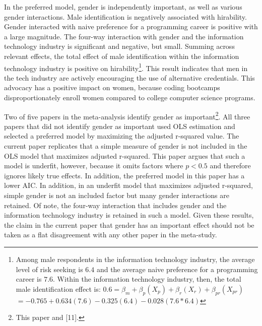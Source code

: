 \documentclass[review]{elsarticle}
\begin{document}
In the preferred model, gender is independently important, as well as various gender interactions.
Male identification is negatively associated with hirability.
Gender interacted with naive preference for a programming career is positive with a large magnitude.
The four-way interaction with gender and the information technology industry is significant and negative, but small.
Summing across relevant effects,
the total effect of male identification within the information technology industry
is positive on hirability\footnote{
    Among male respondents in the information technology industry, the average level of risk seeking is $6.4$
    and the average naive preference for a programming career is $7.6$.
    Within the information technology industry, then, the total male identification effect is:
    $ 0.6 = \beta_{m} + \beta_{p}(X_{p}) + \beta_{r}(X_{r}) + \beta_{pr}(X_{pr})$
    $ = -0.765 + 0.634(7.6) - 0.325(6.4) - 0.028(7.6*6.4)$
}.
This result indicates that men in the tech industry are actively encouraging the use of alternative credentials.
This advocacy has a positive impact on women, because coding bootcamps disproportionately enroll women compared to college computer science programs.

Two of five papers in the meta-analysis identify gender as important\footnote{
    This paper and [11].
}.
All three papers that did not identify gender as important used OLS estimation
and selected a preferred model by maximizing the adjusted r-squared value.
The current paper replicates that a simple measure of gender is not included in the OLS model
that maximizes adjusted r-squared.
This paper argues that such a model is underfit, however, because it omits
factors where $p < 0.5$ and therefore ignores likely true effects.
In addition, the preferred model in this paper has a lower AIC.
In addition, in an underfit model that maximizes adjusted r-squared,
simple gender is not an included factor but many gender interactions are retained.
Of note, the four-way interaction that includes gender and the information technology industry is retained
in such a model.
Given these results,
the claim in the current paper that gender has an important effect should not be taken as a
flat disagreement with any other paper in the meta-study.

\end{document}
